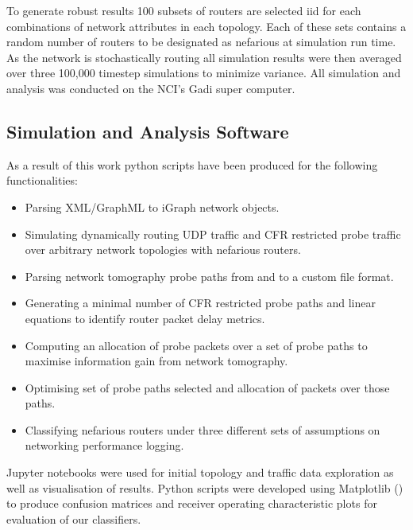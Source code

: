 To generate robust results 100 subsets of routers are selected iid for each combinations of network attributes in each topology. Each of these sets contains a random number of routers to be designated as nefarious at simulation run time. As the network is stochastically routing all simulation results were then averaged over three 100,000 timestep simulations to minimize variance. All simulation and analysis was conducted on the NCI's Gadi super computer.\par

\subsection{Simulation and Analysis Software}
\label{ssec:Msoftware}
As a result of this work python scripts have been produced for the following functionalities:
\begin{itemize}
    \item Parsing XML/GraphML to iGraph network objects.
    \item Simulating dynamically routing UDP traffic and CFR restricted probe traffic over arbitrary network topologies with nefarious routers.
    \item Parsing network tomography probe paths from and to a custom file format.
    \item Generating a minimal number of CFR restricted probe paths and linear equations to identify router packet delay metrics.
    \item Computing an allocation of probe packets over a set of probe paths to maximise information gain from network tomography.
    \item Optimising set of probe paths selected and allocation of packets over those paths.
    \item Classifying nefarious routers under three different sets of assumptions on networking performance logging.
\end{itemize}
Jupyter notebooks were used for initial topology and traffic data exploration as well as visualisation of results. Python scripts were developed using Matplotlib (\cite{hunter_matplotlib_2007}) to produce confusion matrices and receiver operating characteristic plots for evaluation of our classifiers.

